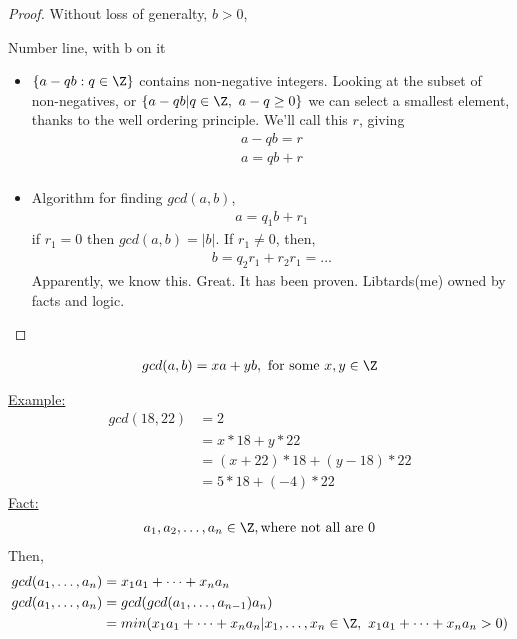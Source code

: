 \documentclass[../notes.tex]{subfiles}
\begin{document}
\begin{proof}
    Without loss of generalty, $b>0$,\\
    \begin{center}
        \Large{Number line, with b on it}\\
    \end{center}
    \begin{itemize}
        \item $\{a-qb: q\in \Z\}$ contains non-negative integers. Looking
            at the subset of non-negatives, or $\{a-qb | q\in \Z,\ a-q\geq0\}$
            we can select a smallest element, thanks to the well ordering
            principle. We'll call this $r$, giving
            \begin{align*}
                a-qb=r\\
                a=qb+r\\
            \end{align*}
        \item Algorithm for finding $gcd(a,b)$,
            \begin{align*}
                a=q_1b+r_1
            \end{align*}
            if $r_1=0$ then $gcd(a,b)=|b|$. If $r_1\neq 0$, then,
            \begin{align*}
                b = q_2r_1+r_2
                r_1=\dots
            \end{align*}
            Apparently, we know this. Great. It has been proven. Libtards(me)
            owned by facts and logic.
    \end{itemize}
\end{proof}
\begin{theorem} %
    \begin{align*}
        gcd(a,b)=xa+yb,\ \text{for some}\ x,y\in\Z\\
    \end{align*}
\end{theorem}
\underline{Example:}
\begin{align*}
    gcd(18,22)&=2\\
    &=x*18+y*22\\
    &=(x+22)*18+(y-18)*22\\
    &=5*18+(-4)*22
\end{align*}
\underline{Fact:}
\begin{align*}
    a_1,a_2,\dots,a_n\in\Z, \text{where not all are 0}\\
\end{align*}
Then,
\begin{align*}
    gcd(a_1,\dots,a_n)&=x_1a_1+\dots+x_na_n\\
    gcd(a_1,\dots,a_n)&=gcd(gcd(a_1,\dots,a_{n-1})a_n)\\
    &=min(x_1a_1+\dots+x_na_n|x_1,\dots,x_n\in \Z,\ x_1a_1+\dots+x_na_n>0)
\end{align*}
\end{document}
